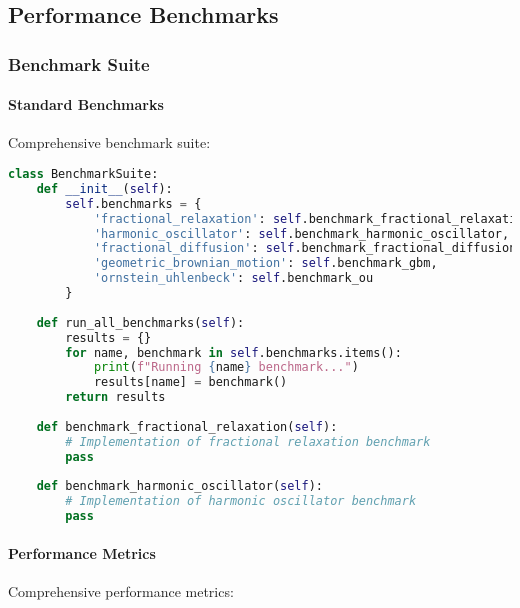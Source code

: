 \subsection{Performance Benchmarks}

\subsubsection{Benchmark Suite}

\paragraph{Standard Benchmarks}
Comprehensive benchmark suite:

\begin{lstlisting}[language=python, caption=Benchmark Suite]
class BenchmarkSuite:
    def __init__(self):
        self.benchmarks = {
            'fractional_relaxation': self.benchmark_fractional_relaxation,
            'harmonic_oscillator': self.benchmark_harmonic_oscillator,
            'fractional_diffusion': self.benchmark_fractional_diffusion,
            'geometric_brownian_motion': self.benchmark_gbm,
            'ornstein_uhlenbeck': self.benchmark_ou
        }
    
    def run_all_benchmarks(self):
        results = {}
        for name, benchmark in self.benchmarks.items():
            print(f"Running {name} benchmark...")
            results[name] = benchmark()
        return results
    
    def benchmark_fractional_relaxation(self):
        # Implementation of fractional relaxation benchmark
        pass
    
    def benchmark_harmonic_oscillator(self):
        # Implementation of harmonic oscillator benchmark
        pass
\end{lstlisting}

\paragraph{Performance Metrics}
Comprehensive performance metrics:

